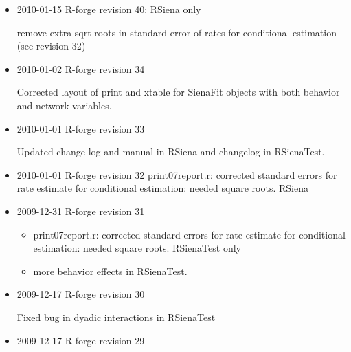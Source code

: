\documentclass[a4paper,fleqn,11pt]{article}
\newcommand{\+}{\, + \,}
\newcommand{\sfn}[1]{\textsf{#1}}
\begin{document}
{\begin{small}
\begin{itemize}
\begin{itemize}
\item
   new effect: Popularity Alter, and altered effect1-3 to integers to correct
  bug in fix(myeff)
  \item new utility functions to update effects object
  \item no longer
  necessary to include underlying effects for interactions.
  \item user parameter for number of unspecified behavior interactions
  \item  remove extra sqrt roots in standard error of rates for conditional
  estimation (see revision 31)
\end{itemize}
\item 2010-01-15 R-forge revision 40: RSiena only

  remove extra sqrt roots in standard error of rates for conditional
  estimation (see revision 32)


\item 2010-01-02 R-forge revision 34

  Corrected layout of \sfn{print} and \sfn{xtable} for \sfn{SienaFit} objects
  with both behavior and network variables.

\item 2010-01-01 R-forge revision 33

Updated change log and manual in RSiena and changelog in RSienaTest.

\item 2010-01-01 R-forge revision 32
    print07report.r: corrected standard errors for rate estimate for
    conditional estimation: needed square roots. RSiena

\item 2009-12-31 R-forge revision 31
\begin{itemize}
\item
    print07report.r: corrected standard errors for rate estimate for
    conditional estimation: needed square roots. RSienaTest only

\item more behavior effects in RSienaTest.
\end{itemize}

\item 2009-12-17 R-forge revision 30

Fixed bug in dyadic interactions in RSienaTest

\item 2009-12-17 R-forge revision 29


\end{itemize}
\end{small}}
\end{document}
